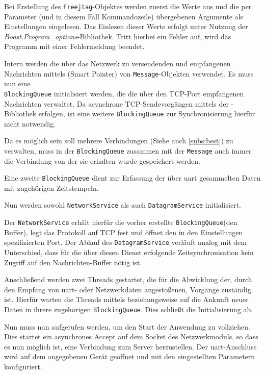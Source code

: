 Bei Erstellung des \texttt{Freejtag}-Objektes werden zuerst die Werte aus
 und die per Parameter (und in diesem Fall
Kommandozeile) übergebenen Argumente als Einstellungen eingelesen.
Das Einlesen dieser Werte erfolgt unter Nutzung der
\emph{Boost.Program\_options}-Bibliothek. Tritt hierbei ein Fehler auf, wird das
Programm mit einer Fehlermeldung beendet.

Intern werden die über das Netzwerk zu versendenden und empfangenen Nachrichten
mittels (Smart Pointer) von
\texttt{Message}-Objekten verwendet. Es muss nun eine \\\texttt{BlockingQueue}
initialisiert werden, die die über den TCP-Port empfangenen Nachrichten
verwaltet. Da asynchrone TCP-Sendevorgängen mittels der
-Bibliothek erfolgen, ist eine weitere
\texttt{BlockingQueue} zur Synchronisierung hierfür nicht notwendig.

Da es möglich sein soll mehrere Verbindungen (Siehe auch \autoref{subs:best}) zu
verwalten, muss in der \texttt{BlockingQueue} zusammen mit der \texttt{Message}
auch immer die Verbindung von der sie erhalten wurde gespeichert werden.

Eine zweite \texttt{BlockingQueue} dient zur Erfassung der über \gls{uart}
gesammelten Daten mit zugehörigen Zeitstempeln. 

Nun werden sowohl \texttt{NetworkService} als auch \texttt{DatagramService}
initialisiert.

Der \texttt{NetworkService} erhält hierfür die vorher erstellte
\texttt{BlockingQueue}(den Buffer), legt das Protokoll auf TCP fest und
öffnet den in den Einstellungen spezifizierten Port. Der Ablauf des
\texttt{DatagramService} verläuft analog mit dem Unterschied, dass für die über
diesen Dienst erfolgende Zeitsynchronisation kein Zugriff auf den
Nachrichten-Buffer nötig ist.

Anschließend werden zwei Threads gestartet, die für die Abwicklung der, durch
den Empfang von \gls{uart}- oder Netzwerkdaten angestoßenen, Vorgänge
zuständig ist. Hierfür warten die Threads mittels  beziehungsweise \newline{} auf die Ankunft neuer Daten in ihrere zugehörigen
\texttt{BlockingQueue}. Dies schließt die Initialisierung ab.

Nun muss nun  aufgerufen werden, um den Start der
Anwendung zu vollziehen. Dies startet ein asynchrones Accept auf dem Socket des
Netzwerkmoduls, so dass es nun möglich ist, eine Verbindung zum Server
herzustellen. Der \gls{uart}-Anschluss wird auf dem angegebenen Gerät geöffnet
und mit den eingestellten Parametern konfiguriert.

